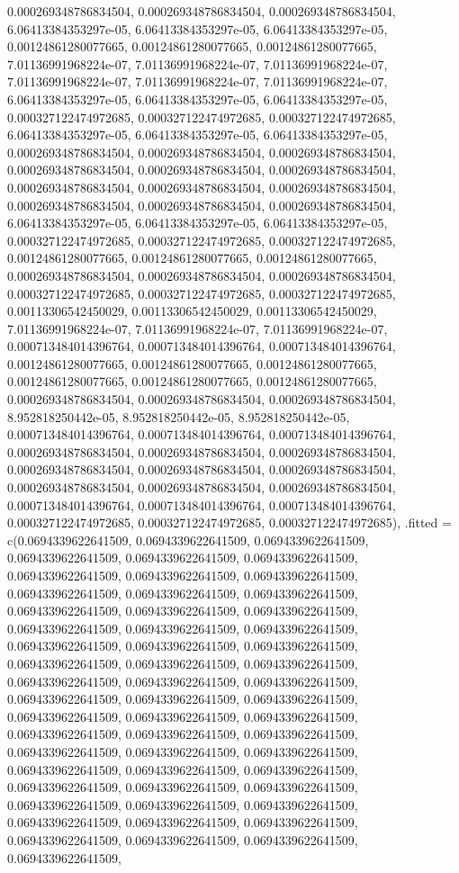 \documentclass[
  ,man]{apa6}
\begin{document}
0.000269348786834504, 0.000269348786834504, 0.000269348786834504, 6.06413384353297e-05, 6.06413384353297e-05, 6.06413384353297e-05, 0.00124861280077665, 0.00124861280077665, 0.00124861280077665, 7.01136991968224e-07, 7.01136991968224e-07, 7.01136991968224e-07, 7.01136991968224e-07, 7.01136991968224e-07, 7.01136991968224e-07, 6.06413384353297e-05, 6.06413384353297e-05, 6.06413384353297e-05, 0.000327122474972685, 0.000327122474972685, 0.000327122474972685, 6.06413384353297e-05, 6.06413384353297e-05,
6.06413384353297e-05, 0.000269348786834504, 0.000269348786834504, 0.000269348786834504, 0.000269348786834504, 0.000269348786834504, 0.000269348786834504, 0.000269348786834504, 0.000269348786834504, 0.000269348786834504, 0.000269348786834504, 0.000269348786834504, 0.000269348786834504, 6.06413384353297e-05, 6.06413384353297e-05, 6.06413384353297e-05, 0.000327122474972685, 0.000327122474972685, 0.000327122474972685, 0.00124861280077665, 0.00124861280077665, 0.00124861280077665, 0.000269348786834504,
0.000269348786834504, 0.000269348786834504, 0.000327122474972685, 0.000327122474972685, 0.000327122474972685, 0.00113306542450029, 0.00113306542450029, 0.00113306542450029, 7.01136991968224e-07, 7.01136991968224e-07, 7.01136991968224e-07, 0.000713484014396764, 0.000713484014396764, 0.000713484014396764, 0.00124861280077665, 0.00124861280077665, 0.00124861280077665, 0.00124861280077665, 0.00124861280077665, 0.00124861280077665, 0.000269348786834504, 0.000269348786834504, 0.000269348786834504, 8.952818250442e-05,
8.952818250442e-05, 8.952818250442e-05, 0.000713484014396764, 0.000713484014396764, 0.000713484014396764, 0.000269348786834504, 0.000269348786834504, 0.000269348786834504, 0.000269348786834504, 0.000269348786834504, 0.000269348786834504, 0.000269348786834504, 0.000269348786834504, 0.000269348786834504, 0.000713484014396764, 0.000713484014396764, 0.000713484014396764, 0.000327122474972685, 0.000327122474972685, 0.000327122474972685), .fitted = c(0.0694339622641509, 0.0694339622641509, 0.0694339622641509,
0.0694339622641509, 0.0694339622641509, 0.0694339622641509, 0.0694339622641509, 0.0694339622641509, 0.0694339622641509, 0.0694339622641509, 0.0694339622641509, 0.0694339622641509, 0.0694339622641509, 0.0694339622641509, 0.0694339622641509, 0.0694339622641509, 0.0694339622641509, 0.0694339622641509, 0.0694339622641509, 0.0694339622641509, 0.0694339622641509, 0.0694339622641509, 0.0694339622641509, 0.0694339622641509, 0.0694339622641509, 0.0694339622641509, 0.0694339622641509, 0.0694339622641509, 0.0694339622641509,
0.0694339622641509, 0.0694339622641509, 0.0694339622641509, 0.0694339622641509, 0.0694339622641509, 0.0694339622641509, 0.0694339622641509, 0.0694339622641509, 0.0694339622641509, 0.0694339622641509, 0.0694339622641509, 0.0694339622641509, 0.0694339622641509, 0.0694339622641509, 0.0694339622641509, 0.0694339622641509, 0.0694339622641509, 0.0694339622641509, 0.0694339622641509, 0.0694339622641509, 0.0694339622641509, 0.0694339622641509, 0.0694339622641509, 0.0694339622641509, 0.0694339622641509, 0.0694339622641509,
\end{document}
